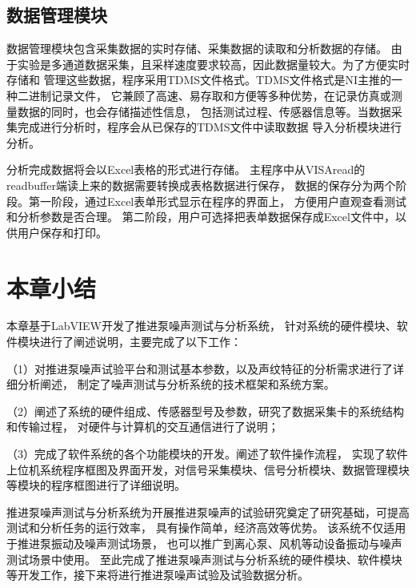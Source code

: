 \subsection{数据管理模块}
数据管理模块包含采集数据的实时存储、采集数据的读取和分析数据的存储。
由于实验是多通道数据采集，且采样速度要求较高，因此数据量较大。为了方便实时存储和
管理这些数据，程序采用TDMS文件格式。TDMS文件格式是NI主推的一种二进制记录文件，
它兼顾了高速、易存取和方便等多种优势，在记录仿真或测量数据的同时，也会存储描述性信息，
包括测试过程、传感器信息等。当数据采集完成进行分析时，程序会从已保存的TDMS文件中读取数据
导入分析模块进行分析。

分析完成数据将会以Excel表格的形式进行存储。
主程序中从VISAread的readbuffer端读上来的数据需要转换成表格数据进行保存，
数据的保存分为两个阶段。第一阶段，通过Excel表单形式显示在程序的界面上，
方便用户直观查看测试和分析参数是否合理。
第二阶段，用户可选择把表单数据保存成Excel文件中，以供用户保存和打印。
\begin{comment}
\begin{figure}[htbp]
    \centering
    \texttt{[image: 2文件存储.png]}
    \caption{\label{fig:save}数据实时存储程序框图}
\end{figure}
\begin{figure}[htbp]
    \centering
    \texttt{[image: 2文件读取.jpg]}
    \caption{\label{fig:read}数据读取程序框图}
\end{figure}
\end{comment}
\section{本章小结}
本章基于LabVIEW开发了推进泵噪声测试与分析系统，
针对系统的硬件模块、软件模块进行了阐述说明，主要完成了以下工作：

（1）对推进泵噪声试验平台和测试基本参数，以及声纹特征的分析需求进行了详细分析阐述，
制定了噪声测试与分析系统的技术框架和系统方案。

（2）阐述了系统的硬件组成、传感器型号及参数，研究了数据采集卡的系统结构和传输过程，
对硬件与计算机的交互通信进行了说明；

（3）完成了软件系统的各个功能模块的开发。阐述了软件操作流程，
实现了软件上位机系统程序框图及界面开发，对信号采集模块、信号分析模块、数据管理模块等模块的程序框图进行了详细说明。

推进泵噪声测试与分析系统为开展推进泵噪声的试验研究奠定了研究基础，可提高测试和分析任务的运行效率，
具有操作简单，经济高效等优势。
该系统不仅适用于推进泵振动及噪声测试场景，
也可以推广到离心泵、风机等动设备振动与噪声测试场景中使用。
至此完成了推进泵噪声测试与分析系统的硬件模块、软件模块等开发工作，接下来将进行推进泵噪声试验及试验数据分析。

